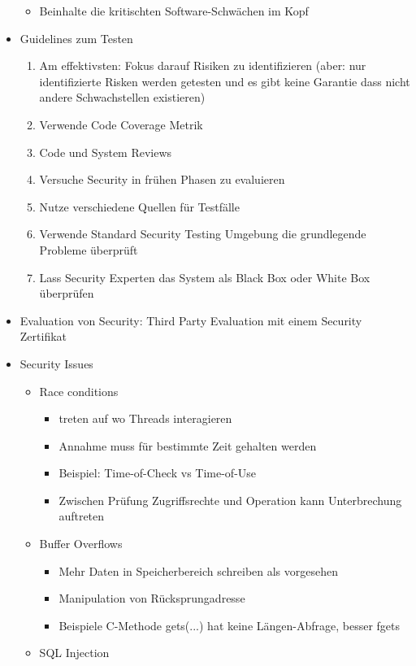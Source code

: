 \documentclass[paper=a4, fontsize=11pt]{scrartcl} %
\numberwithin{equation}{section} %
\numberwithin{figure}{section} %
\numberwithin{table}{section} %
\begin{document}
\begin{itemize}
\begin{itemize}
    \item Beinhalte die kritischten Software-Schwächen im Kopf
  \end{itemize}
  \item Guidelines zum Testen
  \begin{enumerate}
    \item Am effektivsten: Fokus darauf Risiken zu identifizieren (aber: nur identifizierte Risken werden getesten und es gibt keine Garantie dass nicht andere Schwachstellen existieren)
    \item Verwende Code Coverage Metrik
    \item Code und System Reviews
    \item Versuche Security in frühen Phasen zu evaluieren
    \item Nutze verschiedene Quellen für Testfälle
    \item Verwende Standard Security Testing Umgebung die grundlegende Probleme überprüft
    \item Lass Security Experten das System als Black Box oder White Box überprüfen
  \end{enumerate}
  \item Evaluation von Security: Third Party Evaluation mit einem Security Zertifikat
  \item Security Issues
  \begin{itemize}
    \item Race conditions
    \begin{itemize}
      \item treten auf wo Threads interagieren
      \item Annahme muss für bestimmte Zeit gehalten werden
      \item Beispiel: Time-of-Check vs Time-of-Use
      \item Zwischen Prüfung Zugriffsrechte und Operation kann Unterbrechung auftreten
    \end{itemize}
    \item Buffer Overflows
    \begin{itemize}
      \item Mehr Daten in Speicherbereich schreiben als vorgesehen
      \item Manipulation von Rücksprungadresse
      \item Beispiele C-Methode gets(...) hat keine Längen-Abfrage, besser fgets
    \end{itemize}
    \item SQL Injection
    \begin{itemize}

\end{itemize}
\end{itemize}
\end{itemize}
\end{document}
